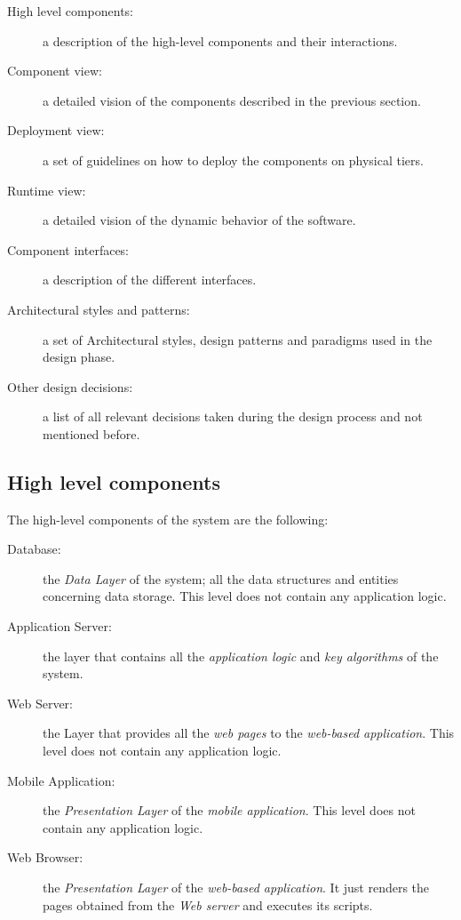 \documentclass{article}
\begin{document}
	\bigskip
	\begin{description}
	\item [High level components:] a description of the high-level components and their interactions.
	\item [Component view:] a detailed vision of the components described in the previous section.
	\item [Deployment view:] a set of guidelines on how to deploy the components on physical tiers.
	\item [Runtime view:] a detailed vision of the dynamic behavior of the software.
	\item [Component interfaces:] a description of the different interfaces.
	\item [Architectural styles and patterns:] a set of Architectural styles, design patterns and paradigms used in the design phase.
	\item [Other design decisions:] a list of all relevant decisions taken during the design process and not mentioned before.
	\end{description}


	\subsection{High level components}

	The high-level components of the system are the following:

	\begin{description}
	\item [Database:] the \textit{Data Layer} of the system; all the data structures and entities concerning data storage. This level does not contain any application logic.
	\item [Application Server:] the layer that contains all the \textit{application logic} and \textit{key algorithms} of the system.
	\item [Web Server:] the Layer that provides all the \textit{web pages} to the \textit{web-based application}. This level does not contain any application logic.
	\item [Mobile Application:] the \textit{Presentation Layer} of the \textit{mobile application}. This level does not contain any application logic.
	\item [Web Browser:] the \textit{Presentation Layer} of the \textit{web-based application}. It just renders the pages obtained from the \textit{Web server} and executes its scripts.
	\end{description}
\end{document}
